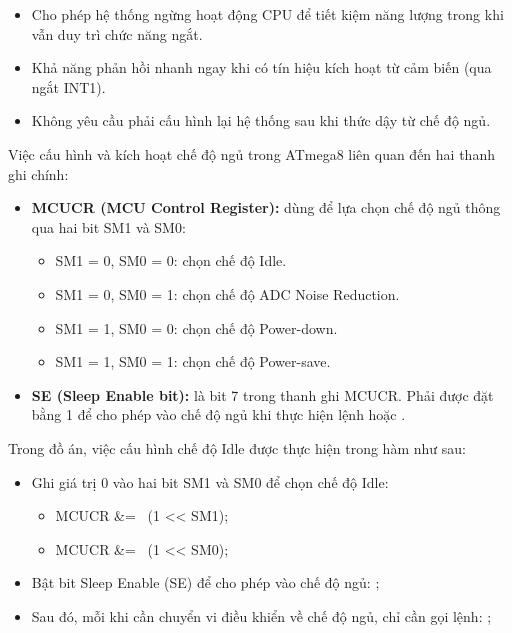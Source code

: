 \documentclass[../DoAn.tex]{subfiles}
\begin{document}
\begin{itemize}
    \item Cho phép hệ thống ngừng hoạt động CPU để tiết kiệm năng lượng trong khi vẫn duy trì chức năng ngắt.
    \item Khả năng phản hồi nhanh ngay khi có tín hiệu kích hoạt từ cảm biến (qua ngắt INT1).
    \item Không yêu cầu phải cấu hình lại hệ thống sau khi thức dậy từ chế độ ngủ.
\end{itemize}

Việc cấu hình và kích hoạt chế độ ngủ trong ATmega8 liên quan đến hai thanh ghi chính:

\begin{itemize}
    \item \textbf{MCUCR (MCU Control Register):} dùng để lựa chọn chế độ ngủ thông qua hai bit SM1 và SM0:
    \begin{itemize}
        \item SM1 = 0, SM0 = 0: chọn chế độ Idle.
        \item SM1 = 0, SM0 = 1: chọn chế độ ADC Noise Reduction.
        \item SM1 = 1, SM0 = 0: chọn chế độ Power-down.
        \item SM1 = 1, SM0 = 1: chọn chế độ Power-save.
    \end{itemize}

    \item \textbf{SE (Sleep Enable bit):} là bit 7 trong thanh ghi MCUCR. Phải được đặt bằng 1 để cho phép vào chế độ ngủ khi thực hiện lệnh  hoặc .
\end{itemize}

Trong đồ án, việc cấu hình chế độ Idle được thực hiện trong hàm  như sau:

\begin{itemize}
    \item Ghi giá trị 0 vào hai bit SM1 và SM0 để chọn chế độ Idle:
    \begin{itemize}
        \item MCUCR &= ~(1 << SM1);
        \item MCUCR &= ~(1 << SM0);
    \end{itemize}
    \item Bật bit Sleep Enable (SE) để cho phép vào chế độ ngủ: ;
    
    \item Sau đó, mỗi khi cần chuyển vi điều khiển về chế độ ngủ, chỉ cần gọi lệnh: ;
\end{itemize}
\end{document}
